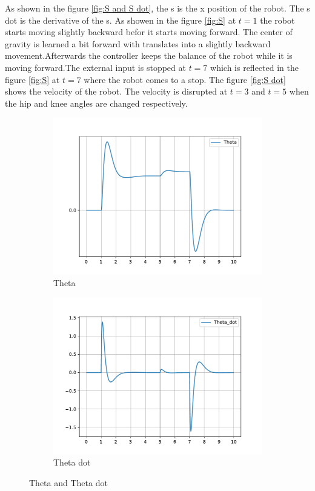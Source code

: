 As shown in the figure \ref{fig:S and S dot}, the s is the x position of the robot. The s dot is the derivative of the s. As showen in the figure \ref{fig:S} at $t=1$ the robot starts moving slightly backward befor it starts moving forward. The center of gravity is learned a bit forward with translates into a slightly backward movement.Afterwards the controller keeps the balance of the robot while it is moving forward.The external input is stopped at $t=7$ which is reflected in the figure \ref{fig:S} at $t=7$ where the robot comes to a stop. The figure \ref{fig:S dot} shows the velocity of the robot. The velocity is disrupted at $t=3$ and $t=5$ when the hip and knee angles are changed respectively.
\begin{figure}[h]
	\centering
	\begin{subfigure}[t]{0.45\textwidth}
		\includegraphics[width=\textwidth]{Theta}
		\caption{Theta}
		\label{fig:Theta}
	\end{subfigure}
	\begin{subfigure}[t]{0.45\textwidth}
		\includegraphics[width=\textwidth]{Theta_dot}
		\caption{Theta dot}
		\label{fig:Theta dot}
	\end{subfigure}
	\caption{Theta and Theta dot}
	\label{fig:Theta and Theta dot}
\end{figure}

